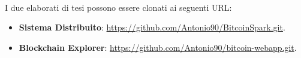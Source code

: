 \\I due elaborati di tesi possono essere clonati ai seguenti URL:
\begin{itemize}
\item \textbf{Sistema Distribuito}: \href{https://github.com/Antonio90/BitcoinSpark.git}{https://github.com/Antonio90/BitcoinSpark.git}.
\item \textbf{Blockchain Explorer}: \href{https://github.com/Antonio90/bitcoin-webapp.git}{https://github.com/Antonio90/bitcoin-webapp.git}. 
\end{itemize}